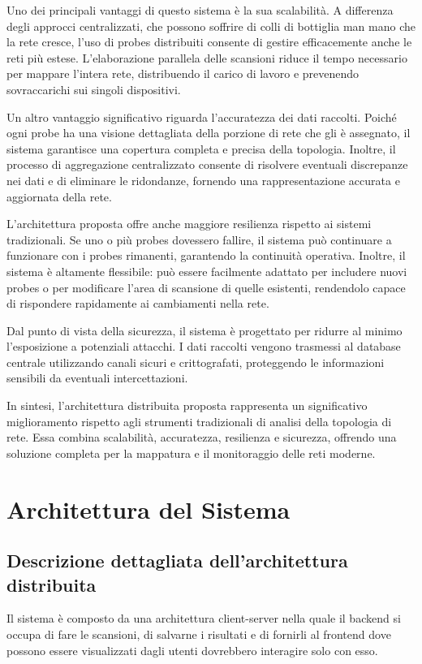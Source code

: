 \documentclass[target=bach,aauheader=,style=]{thud}
\begin{document}
Uno dei principali vantaggi di questo sistema è la sua scalabilità. A differenza degli approcci centralizzati, che possono soffrire di colli di bottiglia man mano che la rete cresce, l'uso di probes distribuiti consente di gestire efficacemente anche le reti più estese. L'elaborazione parallela delle scansioni riduce il tempo necessario per mappare l'intera rete, distribuendo il carico di lavoro e prevenendo sovraccarichi sui singoli dispositivi.

Un altro vantaggio significativo riguarda l'accuratezza dei dati raccolti. Poiché ogni probe ha una visione dettagliata della porzione di rete che gli è assegnato, il sistema garantisce una copertura completa e precisa della topologia. Inoltre, il processo di aggregazione centralizzato consente di risolvere eventuali discrepanze nei dati e di eliminare le ridondanze, fornendo una rappresentazione accurata e aggiornata della rete.

L'architettura proposta offre anche maggiore resilienza rispetto ai sistemi tradizionali. Se uno o più probes dovessero fallire, il sistema può continuare a funzionare con i probes rimanenti, garantendo la continuità operativa. Inoltre, il sistema è altamente flessibile: può essere facilmente adattato per includere nuovi probes o per modificare l'area di scansione di quelle esistenti, rendendolo capace di rispondere rapidamente ai cambiamenti nella rete.

Dal punto di vista della sicurezza, il sistema è progettato per ridurre al minimo l'esposizione a potenziali attacchi. I dati raccolti vengono trasmessi al database centrale utilizzando canali sicuri e crittografati, proteggendo le informazioni sensibili da eventuali intercettazioni.

In sintesi, l'architettura distribuita proposta rappresenta un significativo miglioramento rispetto agli strumenti tradizionali di analisi della topologia di rete. Essa combina scalabilità, accuratezza, resilienza e sicurezza, offrendo una soluzione completa per la mappatura e il monitoraggio delle reti moderne.

\section{Architettura del Sistema}
\subsection{Descrizione dettagliata dell'architettura distribuita}
Il sistema è composto da una architettura client-server nella quale il backend si occupa di fare le scansioni, di salvarne i risultati e di fornirli al frontend dove possono essere visualizzati dagli utenti dovrebbero interagire solo con esso. 
\end{document}
